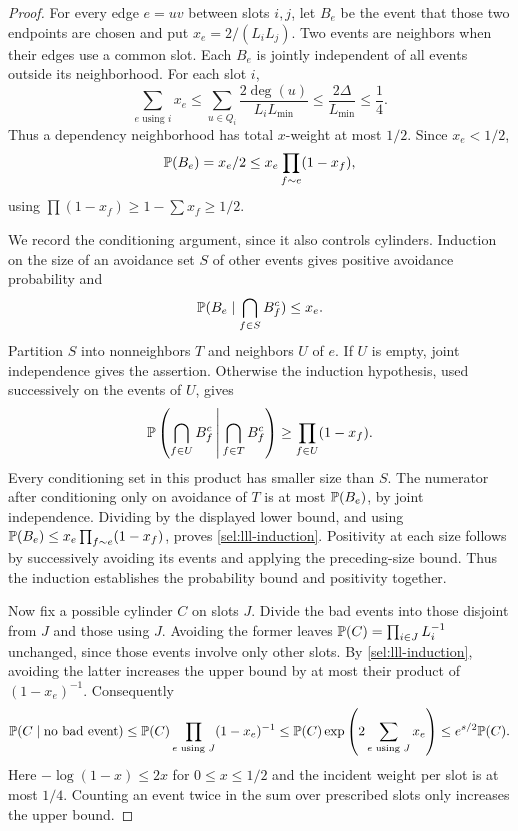 \begin{proof}
For every edge $e=uv$ between slots $i,j$, let $B_e$ be the event
that those two endpoints are chosen and put
$x_e=2/(L_iL_j)$.  Two events are neighbors when their edges use
a common slot.  Each $B_e$ is jointly independent of all events
outside its neighborhood.  For each slot $i$,
\[
 \sum_{e\text{ using }i}x_e
 \le\sum_{u\in Q_i}\frac{2\deg(u)}{L_iL_{\min}}
 \le\frac{2\Delta}{L_{\min}}\le\frac14.
\]
Thus a dependency neighborhood has total $x$-weight at most
$1/2$.  Since $x_e<1/2$,
\[
 \mathbb P(B_e)=x_e/2
 \le x_e\prod_{f\sim e}(1-x_f),
\]
using $\prod(1-x_f)\ge1-\sum x_f\ge1/2$.

We record the conditioning argument, since it also controls cylinders.
Induction on the size of an avoidance set $S$ of other events gives
positive avoidance probability and
\begin{equation}\label{sel:lll-induction}
 \mathbb P(B_e\mid\bigcap_{f\in S}B_f^c)\le x_e.
\end{equation}
Partition $S$ into nonneighbors $T$ and neighbors $U$ of $e$.
If $U$ is empty, joint independence gives the assertion.  Otherwise
the induction hypothesis, used successively on the events of $U$,
gives
\[
 \mathbb P\left(\bigcap_{f\in U}B_f^c
                  \,\middle|\,\bigcap_{f\in T}B_f^c\right)
 \ge\prod_{f\in U}(1-x_f).
\]
Every conditioning set in this product has smaller size than $S$.
The numerator after conditioning only on avoidance of $T$ is at most
$\mathbb P(B_e)$, by joint independence.  Dividing by the displayed
lower bound, and using
$\mathbb P(B_e)\le x_e\prod_{f\sim e}(1-x_f)$, proves
\eqref{sel:lll-induction}.  Positivity at each size follows by
successively avoiding its events and applying the preceding-size
bound.  Thus the induction establishes the probability bound and
positivity together.

Now fix a possible cylinder $C$ on slots $J$.  Divide the bad events
into those disjoint from $J$ and those using $J$.  Avoiding the former
leaves $\mathbb P(C)=\prod_{i\in J}L_i^{-1}$ unchanged, since those
events involve only other slots.  By \eqref{sel:lll-induction},
avoiding the latter increases the upper bound by at most their
product of $(1-x_e)^{-1}$.  Consequently
\[
 \mathbb P(C\mid\hbox{no bad event})
 \le\mathbb P(C)\prod_{e\text{ using }J}(1-x_e)^{-1}
 \le\mathbb P(C)\exp\left(2\sum_{e\text{ using }J}x_e\right)
 \le e^{s/2}\mathbb P(C).
\]
Here $-\log(1-x)\le2x$ for $0\le x\le1/2$ and the incident
weight per slot is at most $1/4$.  Counting an event twice in the
sum over prescribed slots only increases the upper bound.
\end{proof}

